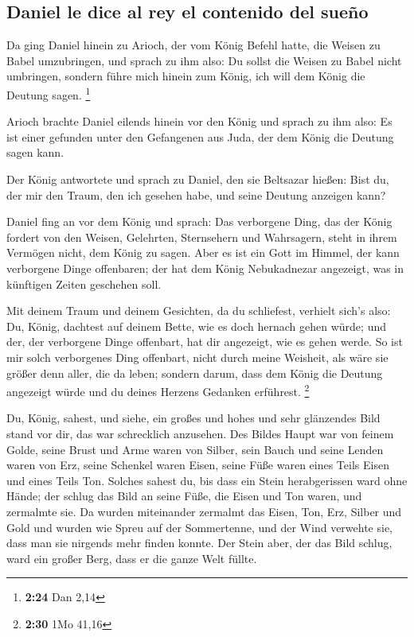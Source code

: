 \hypertarget{daniel-le-dice-al-rey-el-contenido-del-sueuxf1o}{%
\subsection{Daniel le dice al rey el contenido del
sueño}\label{daniel-le-dice-al-rey-el-contenido-del-sueuxf1o}}

 Da ging Daniel hinein zu Arioch, der vom König Befehl
hatte, die Weisen zu Babel umzubringen, und sprach zu ihm also: Du
sollst die Weisen zu Babel nicht umbringen, sondern führe mich hinein
zum König, ich will dem König die Deutung sagen. \footnote{\textbf{2:24}
  Dan 2,14}

 Arioch brachte Daniel eilends hinein vor den König und
sprach zu ihm also: Es ist einer gefunden unter den Gefangenen aus Juda,
der dem König die Deutung sagen kann.

 Der König antwortete und sprach zu Daniel, den sie
Beltsazar hießen: Bist du, der mir den Traum, den ich gesehen habe, und
seine Deutung anzeigen kann?

 Daniel fing an vor dem König und sprach: Das verborgene
Ding, das der König fordert von den Weisen, Gelehrten, Sternsehern und
Wahrsagern, steht in ihrem Vermögen nicht, dem König zu sagen.
 Aber es ist ein Gott im Himmel, der kann verborgene
Dinge offenbaren; der hat dem König Nebukadnezar angezeigt, was in
künftigen Zeiten geschehen soll.

 Mit deinem Traum und deinem Gesichten, da du schliefest,
verhielt sich's also: Du, König, dachtest auf deinem Bette, wie es doch
hernach gehen würde; und der, der verborgene Dinge offenbart, hat dir
angezeigt, wie es gehen werde.  So ist mir solch
verborgenes Ding offenbart, nicht durch meine Weisheit, als wäre sie
größer denn aller, die da leben; sondern darum, dass dem König die
Deutung angezeigt würde und du deines Herzens Gedanken erführest.
\footnote{\textbf{2:30} 1Mo 41,16}

 Du, König, sahest, und siehe, ein großes und hohes und
sehr glänzendes Bild stand vor dir, das war schrecklich anzusehen.
 Des Bildes Haupt war von feinem Golde, seine Brust und
Arme waren von Silber, sein Bauch und seine Lenden waren von Erz,
 seine Schenkel waren Eisen, seine Füße waren eines Teils
Eisen und eines Teils Ton.  Solches sahest du, bis dass
ein Stein herabgerissen ward ohne Hände; der schlug das Bild an seine
Füße, die Eisen und Ton waren, und zermalmte sie.  Da
wurden miteinander zermalmt das Eisen, Ton, Erz, Silber und Gold und
wurden wie Spreu auf der Sommertenne, und der Wind verwehte sie, dass
man sie nirgends mehr finden konnte. Der Stein aber, der das Bild
schlug, ward ein großer Berg, dass er die ganze Welt füllte.

